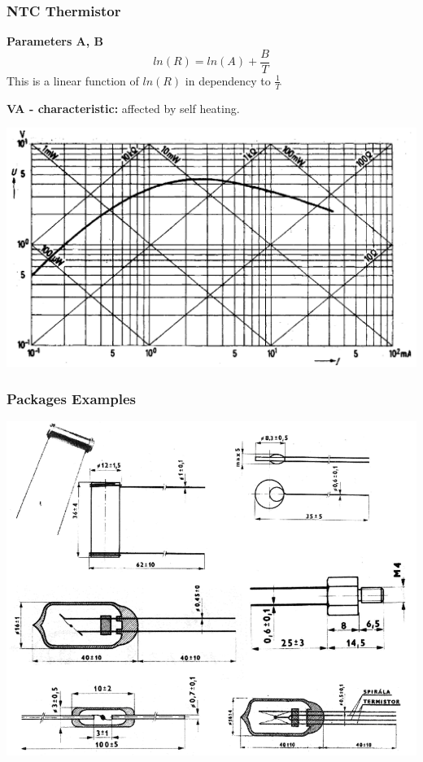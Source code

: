 \documentclass{beamer}
\begin{document}
	\begin{frame}
    \frametitle{NTC Thermistor}
		\begin{flushleft}
		\textbf{Parameters A, B}
		$$ln(R)=ln(A) + \frac{B}{T}$$
		This is a linear function of $ln(R)$ in dependency to $\frac{1}{T}$
		\end{flushleft}
		\begin{flushleft}
		\textbf{VA - characteristic:} affected by self heating.
		\begin{center}
		\includegraphics[scale=0.25]{obr09_vaNTC.png}
		\end{center}
		\end{flushleft}
  \end{frame}
	\begin{frame}
    \frametitle{Packages Examples}
		\begin{center}
		\includegraphics[scale=0.38]{obr10_prikladyNTC.png}
		\end{center}
  \end{frame}
\end{document}
